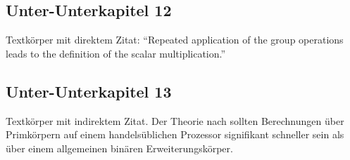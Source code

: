 \subsection{Unter-Unterkapitel 12}
\label{sec:UnterUnterkapitel12}

Textkörper mit direktem Zitat:
``Repeated application of the group operations leads to the definition of the scalar multiplication.'' \cite{Koschuch2006}

\subsection{Unter-Unterkapitel 13}
\label{sec:UnterUnterkapitel13}

Textkörper mit indirektem Zitat.
Der Theorie nach sollten Berechnungen über Primkörpern auf einem handelsüblichen Prozessor signifikant schneller sein als über einem allgemeinen binären Erweiterungskörper. \cite{Hankerson2004}